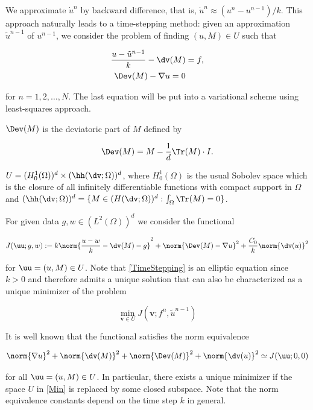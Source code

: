 We approximate $\dot{u}^n$ by backward difference, that is, $\dot{u}^n\approx (u^n-u^{n-1})/k$. This approach naturally leads to a time-stepping method: given an approximation $\tilde{u}^{n-1}$ of $u^{n-1}$, we consider the problem of finding $(u,M)\in U$ such that

\begin{subequations}\label{TimeStepping}
\begin{align}
    \frac{u-\tilde{u}^{n-1}}{k}-\dv(M)&=f,\\
    \Dev(M)-\nabla u =0
\end{align}    
\end{subequations}


for $n=1,2,\dots,N$. The last equation will be put into a variational scheme using least-squares approach.

\begin{remark}
    $\Dev(M)$ is the deviatoric part of $M$ defined by

    $$\Dev(M)=M-\frac{1}{d}\Tr(M)\cdot I.$$

    $U=(H_0^1(\Omega))^d\times (\hh(\dv;\Omega))^d$, where $H_0^1(\Omega)$ is the usual Sobolev space which is the closure of all infinitely differentiable functions with compact support in $\Omega$ and $(\hh(\dv;\Omega))^d=\{M\in (H(\dv;\Omega))^d:\int_\Omega\Tr(M)=0\}$.
\end{remark}

For given data $g,w\in (L^2(\Omega))^d$ we consider the functional

\begin{equation}
    J(\uu;g,w):=k\norm{\frac{u-w}{k}-\dv(M)-g}^2+\norm{\Dev(M)-\nabla u}^2+\frac{C_0}{k}\norm{\dv(u)}^2
\end{equation}

for $\uu=(u,M)\in U$. Note that \eqref{TimeStepping} is an elliptic equation since $k>0$ and therefore admits a unique solution that can also be characterized as a unique minimizer of the problem

\begin{equation}\label{Min}
    \min_{\boldsymbol{v}\in U}J(\boldsymbol{v};f^n,\tilde{u}^{n-1})
\end{equation}

It is well known \cite{cai1994first} that the functional satisfies the norm equivalence 

$$\norm{\nabla u}^2+\norm{\dv(M)}^2+\norm{\Dev(M)}^2+\norm{\dv(u)}^2\simeq J(\uu;0,0)$$

for all $\uu=(u,M)\in U$. In particular, there exists a unique minimizer if the space $U$ in \eqref{Min} is replaced by some closed subspace. Note that the norm equivalence constants depend on the time step $k$ in general.

